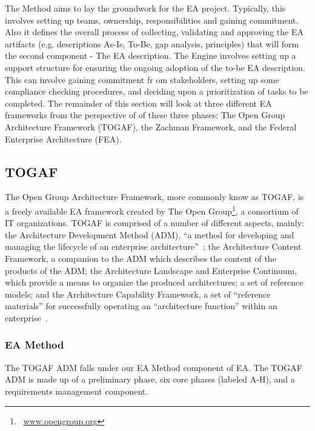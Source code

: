 The Method aims to lay the groundwork for the EA project. Typically, this involves setting up teams, ownership, responsibilities and gaining commitment. Also it defines the overall process of collecting, validating and approving the EA artifacts  (e.g. descriptions As-Is, To-Be, gap analysis,  principles) that will form the second component - The EA description.  The Engine involves setting up a support structure for ensuring the ongoing adoption of the to-be EA description. This can involve gaining commitment fr  om stakeholders, setting up some compliance checking procedures, and deciding upon a prioritization of tasks to be completed. The remainder of this section will look at three different EA frameworks from the perspective of of these three phases: The Open Group Architecture Framework (TOGAF), the Zachman Framework, and the Federal Enterprise Architecture (FEA).


\subsection{TOGAF}
The Open Group Architecture Framework, more commonly know as TOGAF, is a freely available EA framework created by The Open Group\footnote{~\url{www.opengroup.org}}, a consortium of IT organizations. TOGAF is comprised of a number of different aspects, mainly: the Architecture Development Method (ADM), ``a method for developing and managing the lifecycle of an enterprise architecture''~\cite[Ch. 5.1]{togaf9.1}; the Architecture Content Framework, a companion to the ADM which describes the content of the products of the ADM; the Architecture Landscape and Enterprise Continuum, which provide a means to organize the produced architectures; a set of reference models; and the Architecture Capability Framework, a set of ``reference materials'' for successfully operating an ``architecture function'' within an enterprise~\cite[Ch. 45]{togaf9.1}. 

%
%


\subsubsection{EA Method}
The TOGAF ADM falls under our EA Method component of EA. The TOGAF ADM is made up of a preliminary phase, six core phases (labeled A-H), and a requirements management component. 

